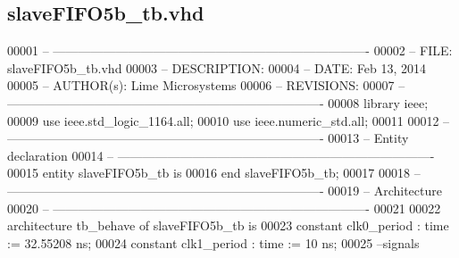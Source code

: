 \subsection{slave\+F\+I\+F\+O5b\+\_\+tb.\+vhd}
\label{slaveFIFO5b__tb_8vhd_source}

\begin{DoxyCode}
00001 \textcolor{keyword}{-- ---------------------------------------------------------------------------- }
00002 \textcolor{keyword}{-- FILE:    slaveFIFO5b\_tb.vhd}
00003 \textcolor{keyword}{-- DESCRIPTION: }
00004 \textcolor{keyword}{-- DATE:    Feb 13, 2014}
00005 \textcolor{keyword}{-- AUTHOR(s):   Lime Microsystems}
00006 \textcolor{keyword}{-- REVISIONS:}
00007 \textcolor{keyword}{-- ---------------------------------------------------------------------------- }
00008 \textcolor{vhdlkeyword}{library }\textcolor{keywordflow}{ieee};
00009 \textcolor{vhdlkeyword}{use }ieee.std\_logic\_1164.\textcolor{keywordflow}{all};
00010 \textcolor{vhdlkeyword}{use }ieee.numeric\_std.\textcolor{keywordflow}{all};
00011 
00012 \textcolor{keyword}{-- ----------------------------------------------------------------------------}
00013 \textcolor{keyword}{-- Entity declaration}
00014 \textcolor{keyword}{-- ----------------------------------------------------------------------------}
00015 \textcolor{keywordflow}{entity }slaveFIFO5b_tb \textcolor{keywordflow}{is}
00016 \textcolor{keywordflow}{end} \textcolor{vhdlchar}{slaveFIFO5b\_tb};
00017 
00018 \textcolor{keyword}{-- ----------------------------------------------------------------------------}
00019 \textcolor{keyword}{-- Architecture}
00020 \textcolor{keyword}{-- ----------------------------------------------------------------------------}
00021 
00022 \textcolor{keywordflow}{architecture} tb\_behave \textcolor{keywordflow}{of} slaveFIFO5b_tb is
00023     \textcolor{keywordflow}{constant} \textcolor{vhdlchar}{clk0_period}   \textcolor{vhdlchar}{:} \textcolor{comment}{time} \textcolor{vhdlchar}{:=} \textcolor{vhdllogic}{}\textcolor{vhdllogic}{32}.\textcolor{vhdllogic}{55208} \textcolor{vhdlchar}{ns};
00024     \textcolor{keywordflow}{constant} \textcolor{vhdlchar}{clk1_period}   \textcolor{vhdlchar}{:} \textcolor{comment}{time} \textcolor{vhdlchar}{:=} \textcolor{vhdllogic}{}\textcolor{vhdllogic}{10} \textcolor{vhdlchar}{ns}; 
00025 \textcolor{keyword}{  --signals}

\end{DoxyCode}
